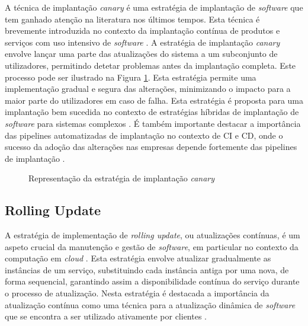 A técnica de implantação \textit{canary} é uma estratégia de implantação de \textit{software} que 
tem ganhado atenção na literatura nos últimos tempos. Esta técnica é brevemente introduzida no 
contexto da implantação contínua de produtos e serviços com uso intensivo de \textit{software} \cite{canary2017}. 
A estratégia de implantação \textit{canary} envolve lançar uma parte das atualizações do sistema a 
um subconjunto de utilizadores, permitindo detetar problemas antes da implantação completa.
Este processo pode ser ilustrado na Figura \ref{fig:canary}. Esta estratégia permite uma 
implementação gradual e segura das alterações, minimizando o impacto para a maior parte do 
utilizadores em caso de falha. Esta estratégia é proposta para uma implantação bem sucedida no 
contexto de estratégias híbridas de implantação de \textit{software} para sistemas complexos 
\cite{canary2022}. É também importante destacar a importância das \glspl{pipeline} automatizadas 
de implantação no contexto de \ac{CI} e \ac{CD}, onde o sucesso da adoção das alterações nas 
empresas depende fortemente das \glspl{pipeline} de implantação \cite{canary2017b}. 

\begin{figure}[H]
    \centering
    \qquad
    \caption{Representação da estratégia de implantação \textit{canary}}%
    \label{fig:canary}%
\end{figure}

\subsection{Rolling Update}

A estratégia de implementação de \textit{rolling update}, ou atualizações contínuas, é um aspeto 
crucial da manutenção e gestão de \textit{software}, em particular no contexto da computação em 
\textit{cloud} \cite{rolling2014}. Esta estratégia envolve atualizar gradualmente as instâncias de 
um serviço, substituindo cada instância antiga por uma nova, de forma sequencial, garantindo assim 
a disponibilidade contínua do serviço durante o processo de atualização. Nesta estratégia é destacada 
a importância da atualização contínua como uma técnica para a atualização dinâmica de \textit{software} 
que se encontra a ser utilizado ativamente por clientes \cite{rolling2014}. 

